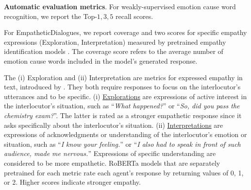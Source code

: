 \documentclass[11pt]{article}
\begin{document}
\textbf{Automatic evaluation metrics}.
For weakly-supervised emotion cause word recognition, we report the Top-$1,3,5$ recall scores. 

For EmpatheticDialogues, we report coverage and two scores for specific empathy expressions (Exploration, Interpretation) measured by pretrained empathy identification models \citep{Sharma:2020:EMNLP}.
The coverage score refers to the average number of emotion cause words included in the model's generated response.


The (i) Exploration and (ii) Interpretation are metrics for expressed empathy in text, introduced by \citet{Sharma:2020:EMNLP}.
They both require responses to focus on the interlocutor's utterances and to be specific.
(i) \underline{Explorations} are expressions of active interest in the interlocutor's situation, such as ``\textit{What happened?}'' or ``\textit{So, did you pass the chemistry exam?}''.
The latter is rated as a stronger empathetic response since it asks specifically about the interlocutor's situation.
(ii) \underline{Interpretations} are expressions of acknowledgments or understanding of the interlocutor's emotion or situation,
such as ``\textit{I know your feeling.}'' or ``\textit{I also had to speak in front of such audience, made me nervous.}''
Expressions of specific understanding are considered to be more empathetic.
RoBERTa models \citep{Liu:2019:arxiv} that are separately pretrained  for each metric rate each agent's response by returning values of 0, 1, or 2.
Higher scores indicate stronger empathy.
\end{document}

